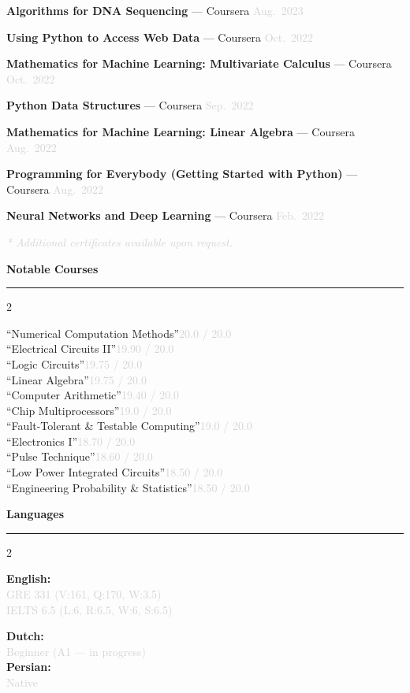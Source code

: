 \documentclass[11pt,a4paper]{article}
\newcommand{\cvsection}[2]{%
  \vspace{0.35cm}%
  \noindent\textcolor{sectiongray}{%
    {\fontsize{11.5pt}{14pt}\selectfont\textbf{#1}}%
    \hspace{0.45em}%
    \textcolor{sectiongray!50}{\rule[0.55ex]{#2\linewidth}{0.45pt}}%
  }%
  \vspace{0.18cm}%
}
\newcommand{\courseentry}[2]{%
  ``#1''\hfill\textcolor{lightgray}{#2}\\[0.3em]%
}
\begin{document}
\footnotesize
\begin{cvlist}
  \item \textbf{Algorithms for DNA Sequencing} — Coursera \hfill\textcolor{lightgray}{Aug.~2023}
  \item \textbf{Using Python to Access Web Data} — Coursera \hfill\textcolor{lightgray}{Oct.~2022}
  \item \textbf{Mathematics for Machine Learning: Multivariate Calculus} — Coursera \hfill\textcolor{lightgray}{Oct.~2022}
  \item \textbf{Python Data Structures} — Coursera \hfill\textcolor{lightgray}{Sep.~2022}
  \item \textbf{Mathematics for Machine Learning: Linear Algebra} — Coursera \hfill\textcolor{lightgray}{Aug.~2022}
  \item \textbf{Programming for Everybody (Getting Started with Python)} — Coursera \hfill\textcolor{lightgray}{Aug.~2022}
  \item \textbf{Neural Networks and Deep Learning} — Coursera \hfill\textcolor{lightgray}{Feb.~2022}
\end{cvlist}

\vspace{0.1em}
{\footnotesize\textit{\textcolor{lightgray}{* Additional certificates available upon request.}}}

\cvsection{Notable Courses}{0.818}

\footnotesize
\begin{multicols}{2}
  \raggedright
  \courseentry{Numerical Computation Methods}{20.0 / 20.0}
  \courseentry{Electrical Circuits II}{19.90 / 20.0}
  \courseentry{Logic Circuits}{19.75 / 20.0}
  \courseentry{Linear Algebra}{19.75 / 20.0}
  \courseentry{Computer Arithmetic}{19.40 / 20.0}
  \courseentry{Chip Multiprocessors}{19.0 / 20.0}
  \columnbreak
  \courseentry{Fault-Tolerant \& Testable Computing}{19.0 / 20.0}
  \courseentry{Electronics I}{18.70 / 20.0}
  \courseentry{Pulse Technique}{18.60 / 20.0}
  \courseentry{Low Power Integrated Circuits}{18.50 / 20.0}
  \courseentry{Engineering Probability \& Statistics}{18.50 / 20.0}
\end{multicols}

\cvsection{Languages}{0.877}

\footnotesize
\begin{multicols}{2}
  \raggedright
  \textbf{English:}\\
  \textcolor{lightgray}{GRE 331 (V:161, Q:170, W:3.5)}\\
  \textcolor{lightgray}{IELTS 6.5 (L:6, R:6.5, W:6, S:6.5)}
  \columnbreak

  \textbf{Dutch:}\\
  \textcolor{lightgray}{Beginner (A1 — in progress)}\\[0.6em]
  \textbf{Persian:}\\
  \textcolor{lightgray}{Native}
\end{multicols}
\end{document}
